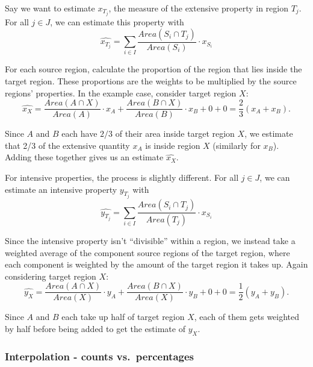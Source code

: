 \documentclass[12pt,twoside]{reedthesis}
\theoremstyle{definition}
\theoremstyle{definition}
\theoremstyle{definition}
\theoremstyle{remark}
\begin{document}
Say we want to estimate \(x_{T_j}\), the measure of the extensive
property in region \(T_j\). For all \(j \in J\), we can estimate this
property with \[
\widehat{x_{T_j}} = \sum_{i \in I} \frac{Area(S_i \cap T_j)}{Area(S_i)} \cdot x_{S_i}
\]

For each source region, calculate the proportion of the region that lies
inside the target region. These proportions are the weights to be
multiplied by the source regions' properties. In the example case,
consider target region \(X\): \[
\widehat{x_X} = \frac{Area(A \cap X)}{Area(A)} \cdot x_{A} + \frac{Area(B \cap X)}{Area(B)} \cdot x_{B} + 0 + 0 = \frac{2}{3}(x_A + x_B).
\]

Since \(A\) and \(B\) each have \(2/3\) of their area inside target
region \(X\), we estimate that 2/3 of the extensive quantity \(x_A\) is
inside region \(X\) (similarly for \(x_B\)). Adding these together gives
us an estimate \(\widehat{x_X}\).

For intensive properties, the process is slightly different. For all
\(j \in J\), we can estimate an intensive property \(y_{T_j}\) with \[
\widehat{y_{T_j}} = \sum_{i \in I} \frac{Area(S_i \cap T_j)}{Area(T_j)} \cdot x_{S_i}
\]

Since the intensive property isn't ``divisible'' within a region, we
instead take a weighted average of the component source regions of the
target region, where each component is weighted by the amount of the
target region it takes up. Again considering target region \(X\): \[
\widehat{y_X} = \frac{Area(A \cap X)}{Area(X)} \cdot y_{A} + \frac{Area(B \cap X)}{Area(X)} \cdot y_{B} + 0 + 0 = \frac{1}{2}(y_A + y_B).
\]

Since \(A\) and \(B\) each take up half of target region \(X\), each of
them gets weighted by half before being added to get the estimate of
\(y_X\).

\hypertarget{interpolation---counts-vs.percentages}{%
\subsubsection{Interpolation - counts
vs.~percentages}\label{interpolation---counts-vs.percentages}}
\end{document}

